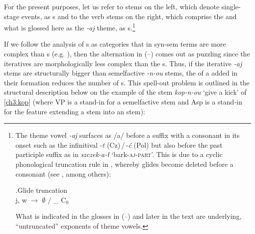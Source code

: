 For the present purposes, let us refer to  stems on the left, which denote single-stage events, as s and to the verb stems on the right, which comprise the  and what is glossed here as the \textit{-aj} theme, as s.\footnote{\label{fn:glidetruncation}The theme vowel \textit{-aj} surfaces as /a/ before a suffix with a consonant in its onset such as the infinitival -\textit{t} (Cz)\,/\,-\textit{\'c} (Pol) but also before the past participle suffix as in \textit{szczek-a-\l{}} `bark-\textsc{aj-part}'. This is due to a cyclic phonological truncation rule in , whereby glides become deleted before a consonant (see \citealt{Jakobson1948,Rubach1984}, among others): 

\noindent\parbox{\linguexfootnotewidth}{\ex.\label{GlideTr}Glide truncation\\[0.5ex] 
j, w $\rightarrow$ $\emptyset$  / \_ C$_{0}$

}

\noindent What is indicated in the glosses in (--) and later in the text are underlying, ``untruncated'' exponents of theme vowels. 
} %
\par
If we follow the analysis of s as categories that in syn-sem terms are more complex than s (e.g. \citealt{Smith1997,Olsen1997,Egg2017}),
then the alternation in (--) comes out as puzzling since the iteratives are morphologically less complex than the s. Thus, if the iterative \textit{-aj} stems are structurally bigger than semelfactive \textit{-n-ou} stems, the  of a  added in their formation reduces the number of s. This spell-out problem is outlined in the structural description below on the example of the stem \textit{kop-n-ou} `give a kick' of \ref{ch3:kop} (where VP is a stand-in for a semelfactive  stem and Asp is a stand-in for the feature extending a  stem into an  stem):

